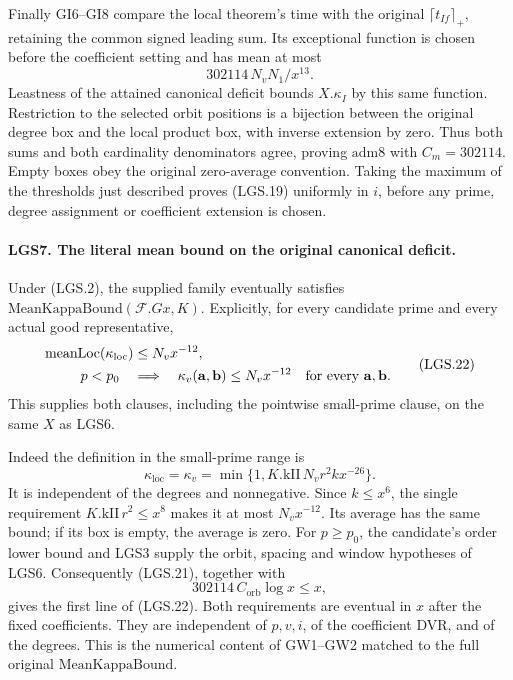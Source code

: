 \documentclass[11pt,a4paper]{article}
\numberwithin{equation}{section}
\theoremstyle{remark}\newtheorem{remark}[theorem]{Remark}
\begin{document}
Finally GI6--GI8 compare the local theorem's time with the
original \(\lceil t_{If}\rceil_+\), retaining the common
signed leading sum.  Its exceptional function is chosen
before the coefficient setting and has mean at most
\[
                   302114\,N_vN_1/x^{13}.             \tag{LGS.21}
\]
Leastness of the attained canonical deficit bounds
\(X.\kappa_I\) by this same function.  Restriction to the
selected orbit positions is a bijection between the
original degree box and the local product box, with inverse
extension by zero.  Thus both sums and both cardinality
denominators agree, proving \(\mathrm{adm8}\) with
\(C_m=302114\).  Empty boxes obey the original zero-average
convention.  Taking the maximum of the thresholds just
described proves (LGS.19) uniformly in \(i\), before any
prime, degree assignment or coefficient extension is chosen.

\paragraph{LGS7. The literal mean bound on the original canonical deficit.}
\label{claim:LGS7}
Under (LGS.2), the supplied family eventually satisfies
\(\mathrm{MeanKappaBound}(\mathcal F.Gx,K)\).
Explicitly, for every candidate prime and every actual good
representative,
\[
 \begin{split}
 \operatorname{meanLoc}(\kappa_{\mathrm{loc}})
       &\le N_vx^{-12},\\
 p<p_0\quad&\Longrightarrow\quad
       \kappa_v(\mathbf a,\mathbf b)\le N_vx^{-12}
       \quad\hbox{for every }\mathbf a,\mathbf b.
 \end{split}                                                     \tag{LGS.22}
\]
This supplies both clauses, including the pointwise
small-prime clause, on the same \(X\) as LGS6.

Indeed the definition in the small-prime range is
\[
 \kappa_{\mathrm{loc}}=\kappa_v
     =\min\{1,K.\mathrm{kII}\,N_vr^2k x^{-26}\}.
 \]
It is independent of the degrees and nonnegative.  Since
\(k\le x^6\), the single requirement
\(K.\mathrm{kII}\,r^2\le x^8\) makes it at most
\(N_vx^{-12}\).  Its average has the same bound; if its
box is empty, the average is zero.
For \(p\ge p_0\), the candidate's order lower bound and
LGS3 supply the orbit, spacing and window hypotheses of
LGS6.  Consequently (LGS.21), together with
\[
                302114\,C_{\mathrm{orb}}\log x\le x,   \tag{LGS.23}
\]
gives the first line of (LGS.22).  Both requirements are
eventual in \(x\) after the fixed coefficients.  They are
independent of \(p,v,i\), of the coefficient DVR, and of
the degrees.  This is the numerical content of GW1--GW2
matched to the full original \(\mathrm{MeanKappaBound}\).
\end{document}
